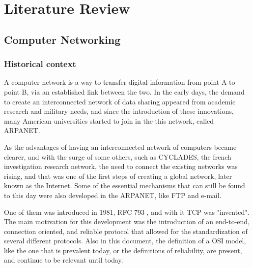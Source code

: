 \chapter{Literature Review} \label{chap:bib} %

\section {Computer Networking}

\subsection {Historical context}
\hspace {5mm} 

A computer network is a way to transfer digital information from point A to point B, via an established link
between the two. In the early days, the demand to create an interconnected network of data sharing 
appeared from academic research and military needs, and since the introduction of these innovations, many 
American universities started to join in the this network, called ARPANET.

\begin{figure}[!tbph]
  \centering
  \hfill
\end{figure}

\p As the advantages of having an interconnected network of computers became clearer, and with the surge of some others, 
such as CYCLADES, the french investigation research network, the need to connect the existing networks was rising, 
and that was one of the first steps of creating a global network, later known as the Internet. Some of the essential mechanisms that can still be found to this day were also developed in the ARPANET, like FTP and e-mail.

\p One of them was introduced in 1981, RFC 793 \cite{postel_transmission_1981}, and with it TCP was "invented".
The main motivation for this development was the introduction of an end-to-end, connection oriented, and reliable protocol that allowed for the standardization of 
several different protocols. Also in this document, the definition of a OSI model, like the one that is prevalent today, or the definitions of reliability, are present, and continue
to be relevant until today.

